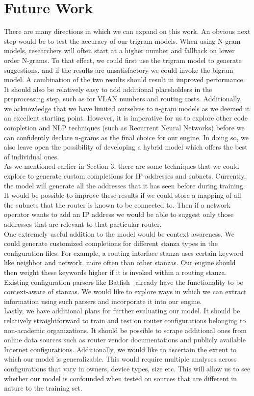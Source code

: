 \section{Future Work}
There are many directions in which we can expand on this work. An obvious next step would be to test the accuracy of our trigram models. When using N-gram models, researchers will often start at a higher number and fallback on lower order N-grams. To that effect, we could first use the trigram model to generate suggestions, and if the results are unsatisfactory we could invoke the bigram model. A combination of the two results should result in improved performance. It should also be relatively easy to add additional placeholders in the preprocessing step, such as for VLAN numbers and routing costs. Additionally, we acknowledge that we have limited ourselves to n-gram models as we deemed it an excellent starting point. However, it is imperative for us to explore other code completion and NLP techniques (such as Recurrent Neural Networks) before we can confidently declare n-grams as the final choice for our engine. In doing so, we also leave open the possibility of developing a hybrid model which offers the best of individual ones.\\

As we mentioned earlier in Section 3, there are some techniques that we could explore to generate custom completions for IP addresses and subnets. Currently, the model will generate all the addresses that it has seen before during training. It would be possible to improve these results if we could store a mapping of all the subnets that the router is known to be connected to. Then if a network operator wants to add an IP address we would be able to suggest only those addresses that are relevant to that particular router.\\

One extremely useful addition to the model would be context awareness. We could generate customized completions for different stanza types in the configuration files. For example, a routing interface stanza uses certain keyword like neighbor and network, more often than other stanzas. Our engine should then weight these keywords higher if it is invoked within a routing stanza. Existing configuration parsers like Batfish~\cite{batfish} already have the functionality to be context-aware of stanzas. We would like to explore ways in which we can extract information using such parsers and incorporate it into our engine.\\ 

Lastly, we have additional plans for further evaluating our model. It should be relatively straightforward to train and test on router configurations belonging to non-academic organizations. It should be possible to scrape additional ones from online data sources such as router vendor documentations and publicly available Internet configurations. Additionally, we would like to ascertain the extent to which our model is generalizable. This would require multiple analyses across configurations that vary in owners, device types, size etc. This will allow us to see whether our model is confounded when tested on sources that are different in nature to the training set.